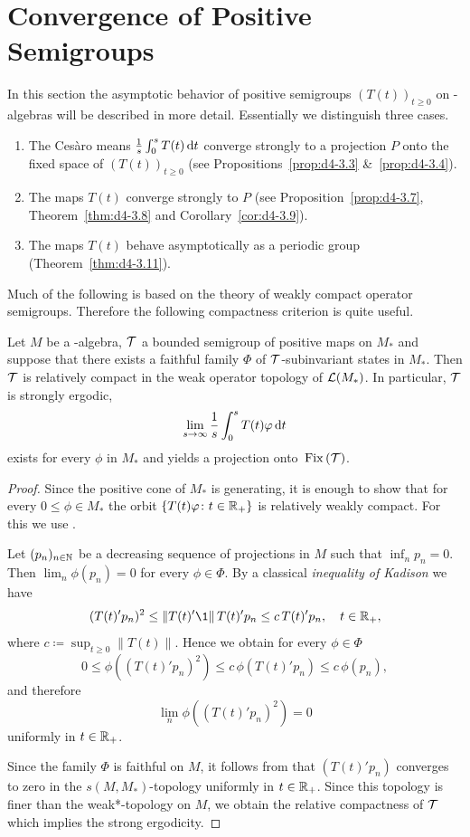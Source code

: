 \section{Convergence of Positive Semigroups}\label{sec:d4-3}
In this section the asymptotic behavior of positive semigroups $(T(t))_{t \geq 0}$ on \WA-algebras will be described in more detail.
Essentially we distinguish three cases.
\begin{enumerate}[\upshape (i), wide, labelindent=.25em]
\item
The Cesàro means $\frac{1}{s}\int_{0}^{s} T(t) \mathop{}\!\mathrm{d}{t}$ converge strongly to a projection $P$ onto the fixed space of\/ $(T(t))_{t \geq 0}$ (see Propositions~\ref{prop:d4-3.3} \&~\ref{prop:d4-3.4}).

\item
The maps $T(t)$ converge strongly to $P$ (see Proposition~\ref{prop:d4-3.7}, Theorem~\ref{thm:d4-3.8} and Corollary~\ref{cor:d4-3.9}).

\item
The maps $T(t)$ behave asymptotically as a periodic group (Theorem~\ref{thm:d4-3.11}).
\end{enumerate}
Much of the following is based on the theory of weakly compact operator semigroups.
Therefore the following compactness criterion is quite useful. 
\begin{proposition}\label{prop:d4-3.1}
Let $M$ be a \WA-algebra, $\mathcal{T}$ a bounded semigroup of positive maps on $M_{*}$ and suppose that there exists a faithful family $\Phi$ of\/ $\mathcal{T}$-subinvariant states in $M_{*}$.
Then $\mathcal{T}$ is relatively compact in the weak operator topology of\/ $ \mathcal{L}(M_{*}) $.
In particular, $\mathcal{T}$ is strongly ergodic, \ie 
%
\[
	\lim_{s \to \infty} \frac{1}{s}\int_{0}^{s} T(t)\phi \dt
\]
%
exists for every $\phi$ in $M_{*}$ and yields a projection onto $\mathop{}\mathrm{Fix}\left(\mathcal{T}\right)$.
\end{proposition}
%
\begin{proof}
Since the positive cone of\/ $M_{*}$ is generating, it is enough to show that for every $0 \leq \phi \in M_{*}$ the orbit $\{T(t)\phi \colon t \in \R_{+}\}$ is relatively weakly compact.
For this we use \textcite[Theorem III.5.4.\,(iii)]{takesaki:1979}.

Let $(p_{n})_{n \in \mathbb{N}}$ be a decreasing sequence of projections in $M$ such that $\inf_{n} p_{n} = 0$.
Then $\lim_{n}\phi(p_{n}) = 0$ for every $\phi \in \Phi$.
By a classical \emph{inequality of Kadison} we have
\[
	(T(t)'p_{n})^2 \leq \|T(t)'\1\|\,T(t)'p_{n} \leq c\,T(t)'p_{n}, \quad t \in \R_{+},
\]
where $c \coloneq \sup_{t \geq 0}\|T(t)\|$.
Hence we obtain for every $\phi \in \Phi$
\[
0 \leq \phi((T(t)'p_{n})^2) \leq c\,\phi(T(t)'p_{n}) \leq c\,\phi(p_{n}),
\]
and therefore
%
\[
	\lim_{n}\phi((T(t)'p_{n})^2) = 0
\]
%
uniformly in $t \in \mathbb{R}_{+}$.

Since the family $\Phi$ is faithful on $M$, it follows from \textcite[Proposition III.5.3]{takesaki:1979} that $(T(t)'p_{n})$ converges to zero in the $s(M,M_{*})$-topology uniformly in $t \in \mathbb{R}_{+}$.
Since this topology is finer than the weak*-topology on $M$, we obtain the relative compactness of\/ $\mathcal{T}$ which implies the strong ergodicity.
\end{proof}
